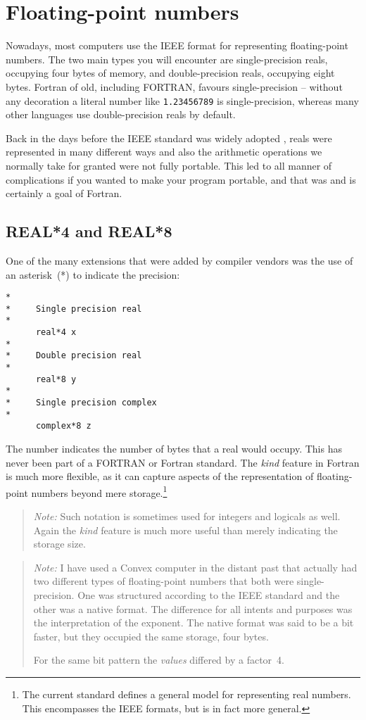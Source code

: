 \section{Floating-point numbers}
Nowadays, most computers use the IEEE format for representing floating-point numbers.
The two main types you will encounter are single-precision reals, occupying four
bytes of memory, and double-precision reals, occupying eight bytes. Fortran of old,
including FORTRAN, favours single-precision -- without any decoration a literal
number like \verb+1.23456789+ is single-precision, whereas many other languages
use double-precision reals by default.

Back in the days before the IEEE standard was widely adopted \cite{IEEE}, reals were
represented in many different ways and also the arithmetic operations we normally take
for granted were not fully portable. This led to all manner of complications if
you wanted to make your program portable, and that was and is certainly a goal of Fortran.

\subsection{REAL*4 and REAL*8}
One of the many extensions that were added by compiler vendors was the use of an asterisk~(*)
to indicate the precision:
\begin{verbatim}
*
*     Single precision real
*
      real*4 x
*
*     Double precision real
*
      real*8 y
*
*     Single precision complex
*
      complex*8 z
\end{verbatim}
The number indicates the number of bytes that a real would occupy. This has never been
part of a FORTRAN or Fortran standard. The \emph{kind} feature in Fortran is much more
flexible, as it can capture aspects of the representation of floating-point numbers
beyond mere storage.\footnote{The current standard defines a general model for representing
real numbers. This encompasses the IEEE formats, but is in fact more general.}

\begin{quote}
\emph{Note:} Such notation is sometimes used for integers and logicals as well. Again
the \emph{kind} feature is much more useful than merely indicating the storage size.
\end{quote}

\begin{quote}
\emph{Note:} I have used a Convex computer in the distant past that actually had two
different types of floating-point numbers that both were single-precision. One was
structured according to the IEEE standard and the other was a native format. The difference
for all intents and purposes was the interpretation of the exponent. The native format
was said to be a bit faster, but they occupied the same storage, four bytes.

For the same bit pattern the \emph{values} differed by a factor~4.
\end{quote}

